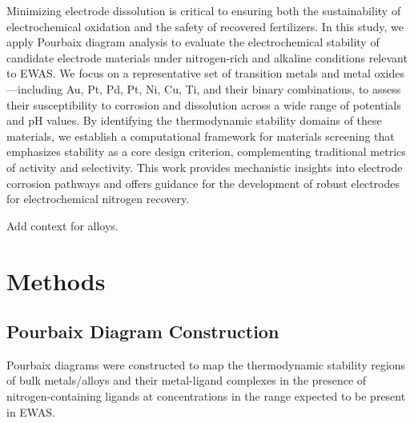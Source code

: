 \documentclass[journal=jacsat,manuscript=article]{achemso}
\begin{document}

Minimizing electrode dissolution is critical to ensuring both the sustainability of electrochemical oxidation and the safety of recovered fertilizers. In this study, we apply Pourbaix diagram analysis to evaluate the electrochemical stability of candidate electrode materials under nitrogen-rich and alkaline conditions relevant to EWAS. We focus on a representative set of transition metals and metal oxides—including Au, Pt, Pd, Pt, Ni, Cu, Ti, and their binary combinations, to assess their susceptibility to corrosion and dissolution across a wide range of potentials and pH values. By identifying the thermodynamic stability domains of these materials, we establish a computational framework for materials screening that emphasizes stability as a core design criterion, complementing traditional metrics of activity and selectivity. This work provides mechanistic insights into electrode corrosion pathways and offers guidance for the development of robust electrodes for electrochemical nitrogen recovery.

Add context for alloys.


\section{Methods}
\subsection{Pourbaix Diagram Construction}
Pourbaix diagrams were constructed to map the thermodynamic stability regions of bulk metals/alloys and their metal-ligand complexes in the presence of nitrogen-containing ligands at concentrations in the range expected to be present in EWAS.
\end{document}
